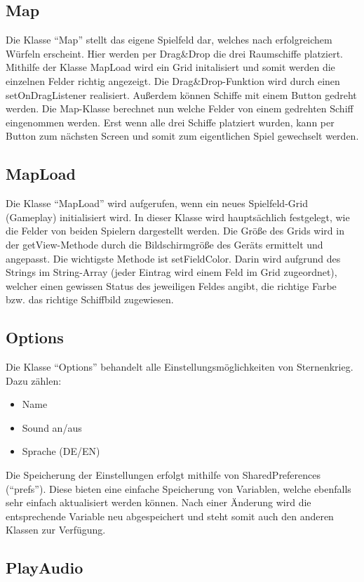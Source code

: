 \documentclass[11pt]{article} %
\begin{document}
\subsection{Map}
Die Klasse \enquote{Map} stellt das eigene Spielfeld dar, welches nach erfolgreichem Würfeln erscheint. Hier werden per Drag\&Drop die drei Raumschiffe platziert. Mithilfe der Klasse MapLoad wird ein Grid initalisiert und somit werden die einzelnen Felder richtig angezeigt. 
Die Drag\&Drop-Funktion wird durch einen setOnDragListener realisiert. Außerdem können Schiffe mit einem Button gedreht werden. Die Map-Klasse berechnet nun welche Felder von einem gedrehten Schiff eingenommen werden.
Erst wenn alle drei Schiffe platziert wurden, kann per Button zum nächsten Screen und somit zum eigentlichen Spiel gewechselt werden.

\subsection{MapLoad}
Die Klasse \enquote{MapLoad} wird aufgerufen, wenn ein neues Spielfeld-Grid (Gameplay) initialisiert wird. In dieser Klasse wird hauptsächlich festgelegt, wie die Felder von beiden Spielern dargestellt werden. Die Größe des Grids wird in der getView-Methode durch die Bildschirmgröße des Geräts ermittelt und angepasst.
Die wichtigste Methode ist setFieldColor. Darin wird aufgrund des Strings im String-Array (jeder Eintrag wird einem Feld im Grid zugeordnet), welcher einen gewissen Status des jeweiligen Feldes angibt, die richtige Farbe bzw. das richtige Schiffbild zugewiesen.

\subsection{Options}
Die Klasse \enquote{Options} behandelt alle Einstellungsmöglichkeiten von Sternenkrieg. Dazu zählen:
\begin{itemize}
\item Name
\item Sound an/aus
\item Sprache (DE/EN)
\end{itemize}
Die Speicherung der Einstellungen erfolgt mithilfe von SharedPreferences (\enquote{prefs}). Diese bieten eine einfache Speicherung von Variablen, welche ebenfalls sehr einfach aktualisiert werden können. Nach einer Änderung wird die entsprechende Variable neu abgespeichert und steht somit auch den anderen Klassen zur Verfügung.

\subsection{PlayAudio}
\end{document}
